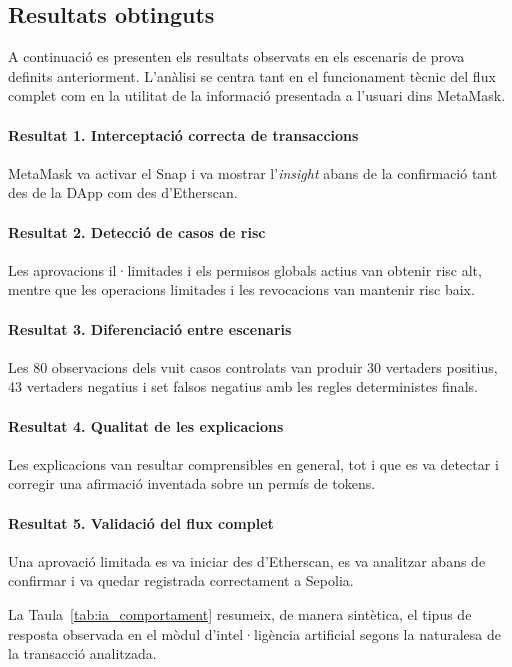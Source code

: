 \subsection{Resultats obtinguts}

A continuació es presenten els resultats observats en els escenaris de prova definits anteriorment. L’anàlisi se centra tant en el funcionament tècnic del flux complet com en la utilitat de la informació presentada a l’usuari dins MetaMask.

\paragraph{Resultat 1. Interceptació correcta de transaccions}
MetaMask va activar el Snap i va mostrar l'\textit{insight} abans de la confirmació tant des de la DApp com des d'Etherscan.

\paragraph{Resultat 2. Detecció de casos de risc}
Les aprovacions il·limitades i els permisos globals actius van obtenir risc alt, mentre que les operacions limitades i les revocacions van mantenir risc baix.

\paragraph{Resultat 3. Diferenciació entre escenaris}
Les 80 observacions dels vuit casos controlats van produir 30 vertaders positius, 43 vertaders negatius i set falsos negatius amb les regles deterministes finals.

\paragraph{Resultat 4. Qualitat de les explicacions}
Les explicacions van resultar comprensibles en general, tot i que es va detectar i corregir una afirmació inventada sobre un permís de tokens.

\paragraph{Resultat 5. Validació del flux complet}
Una aprovació limitada es va iniciar des d'Etherscan, es va analitzar abans de confirmar i va quedar registrada correctament a Sepolia.


La Taula~\ref{tab:ia_comportament} resumeix, de manera sintètica, el tipus de resposta observada en el mòdul d'intel·ligència artificial segons la naturalesa de la transacció analitzada.

